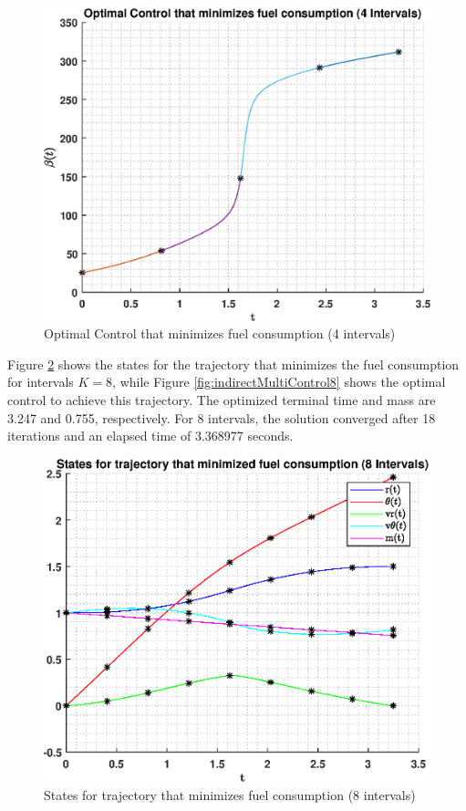 \documentclass[]{article}
\begin{document}
\begin{figure}
	\centering
	\includegraphics[scale=0.75]{indirectMultiControl4.eps}
	\caption{Optimal Control that minimizes fuel consumption (4 intervals)}
	\label{fig:indirectMultiControl4}
\end{figure}
\vspace{2mm}\newline 
Figure \ref{fig:indirectMultiStates8} shows the states for the trajectory that minimizes the fuel consumption for intervals \(K = 8\), while Figure \ref{fig:indirectMultiControl8} shows the optimal control to achieve this trajectory. The optimized terminal time and mass are 3.247 and 0.755, respectively. For 8 intervals, the solution converged after 18 iterations and an elapsed time of 3.368977 seconds. 
\begin{figure}
	\centering
	\includegraphics[scale=0.75]{indirectMultiStates8.eps}
	\caption{States for trajectory that minimizes fuel consumption (8 intervals)}
	\label{fig:indirectMultiStates8}
\end{figure}
\end{document}
